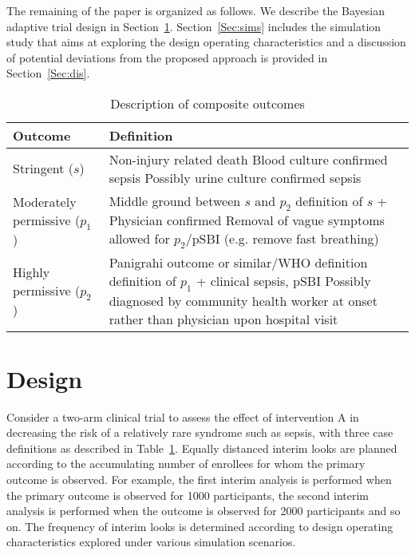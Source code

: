 \documentclass[12pt]{article}
\begin{document}
The remaining of the paper is organized as follows. We describe the Bayesian adaptive trial design in Section~\ref{Sec:design}. Section~\ref{Sec:sims} includes the simulation study that aims at exploring the design operating characteristics and a discussion of potential deviations from the proposed approach is provided in Section~\ref{Sec:dis}.

\begin{table}
\begin{tabular} {|l | p{10.5cm}|}
	\hline
	Outcome & Definition\\
	\hline
Stringent ($s$) &	Non-injury related death
\newline
                        Blood culture confirmed sepsis
\newline
                        Possibly urine culture confirmed sepsis
\\
    \hline
Moderately permissive ($p_1$)	& Middle ground between $s$ and $p_2$
\newline
                                                     definition of $s$ + Physician confirmed
\newline
                                                     Removal of vague symptoms allowed for $p_2$/pSBI
\newline
                                                     (e.g. remove fast breathing)
\\
      \hline
Highly permissive ($p_2$)	& Panigrahi outcome or similar/WHO definition
\newline                                     
                                                definition of $p_1$ +  clinical sepsis, pSBI
\newline
                                               Possibly diagnosed by community health worker at onset rather than physician upon hospital visit
\\
        \hline
\end{tabular}

   \caption{ Description of composite outcomes}
\label{t1}  
\end{table}



\section{Design}\label{Sec:design}

Consider a two-arm clinical trial to assess the effect of intervention A in decreasing the risk of a relatively rare syndrome such as sepsis, with three case definitions as described in Table~\ref{t1}. Equally distanced interim looks are planned according to the accumulating number of enrollees for whom the primary outcome is observed. For example, the first interim analysis is performed when the primary outcome is observed for 1000 participants, the second interim analysis is performed when the outcome is observed for 2000 participants and so on. The frequency of interim looks is determined according to design operating characteristics explored under various simulation scenarios.
\end{document}
